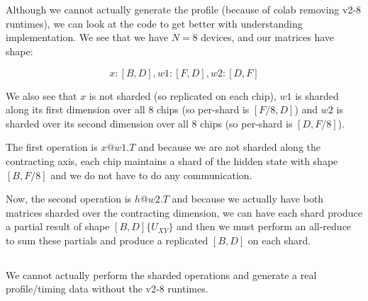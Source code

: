 \documentclass[11pt]{article}
\newcommand{\exercisebreak}{\Needspace{8\baselineskip}}
\begin{document}
\clearpage
\section{}

\exercisebreak
\subsection{}

Although we cannot actually generate the profile (because of colab removing v2-8 runtimes), we can look at the code to get better with understanding implementation.
We see that we have $N=8$ devices, and our matrices have shape:

$$x: [B, D], w1: [F, D], w2: [D, F]$$

We also see that $x$ is not sharded (so replicated on each chip), $w1$ is sharded along its first dimension over all $8$ chips (so per-shard is $[F/8, D]$) 
and $w2$ is sharded over its second dimension over all $8$ chips (so per-shard is $[D, F/8]$).

The first operation is $x @ w1.T$ and because we are not sharded along the contracting axis, each chip maintains a shard of the hidden state with shape $[B, F/8]$ and we do
not have to do any communication.

Now, the second operation is $h @ w2.T$ and because we actually have both matrices sharded over the contracting dimension, we can have each shard produce a partial result
of shape $[B, D]\{U_{XY}\}$ and then we must perform an all-reduce to sum these partials and produce a replicated $[B, D]$ on each shard.

\exercisebreak
\subsection{}
We cannot actually perform the sharded operations and generate a real profile/timing data without the v2-8 runtimes.

\clearpage
\section{}

\exercisebreak
\end{document}
